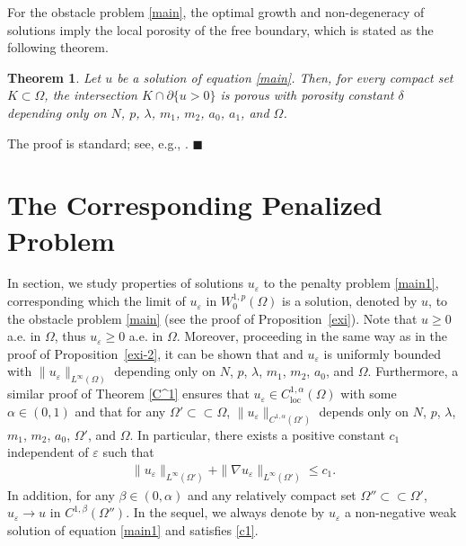 \documentclass[onecolumn]{autart}
\newtheorem{theorem}{Theorem} %
\newenvironment{proof}{{\it Proof: \enspace}}{\hfill $\blacksquare$\par}
\begin{document}
	
	
	
	
	For the obstacle problem \eqref{main},
	the optimal growth and non-degeneracy of solutions imply the local porosity of the free boundary, which is stated as the following theorem.
	
	
	\begin{theorem}\label{duo}
		Let $ u $ be  a  solution of equation \eqref{main}. Then, for every compact set $ K \subset \Omega $, the intersection $ K \cap \partial\{u > 0\} $ is porous with porosity constant $ \delta $ depending only on $N$, $p$, $\lambda$, $m_1$, $m_2$, $a_0$, $a_1$,  and $ \Omega $.
	\end{theorem}
	\begin{proof}
		The proof is standard; see, e.g.,  \cite{Karp:2000,Challal:2009,Hu:2024}.
	\end{proof}
	
	
	
	\section{The Corresponding Penalized Problem}\label{Sec.6}
	
	
	In section,  we study properties  of  solutions $u_\varepsilon$ to the   penalty problem  \eqref{main1}, corresponding which  the limit of  $u_\varepsilon$  in $W^{1,p}_0(\Omega)$ is  a solution, denoted by $u$, to the obstacle problem \eqref{main} (see the proof of Proposition~\ref{exi}). Note that $u\geq 0$ a.e. in $\Omega$, thus $u_\varepsilon \geq 0$ a.e. in $\Omega$. Moreover, proceeding in the same way as in the proof  of  Proposition~\ref{exi-2}, it can   be shown that  and
	$u_\varepsilon$ is uniformly bounded with
	$\|u_\varepsilon\|_{L^\infty(\Omega)}$   depending only on $N$, $p$, $\lambda$, $m_1$, $m_2$, $a_0$, and  $\Omega$. Furthermore,  a similar proof of  Theorem \ref{C^1} ensures that  $u_\varepsilon\in C^{1,\alpha}_{\mathrm{loc}}(\Omega)$ with some $\alpha \in (0,1)$ and that for any $\Omega' \subset \subset \Omega$,   $\|u_\varepsilon\|_{C^{1,\alpha}(\Omega')}$  {depends only on } $N$, $p$, $\lambda$, $m_1$, $m_2$, $a_0$, $\Omega'$, and $\Omega$. In particular, there exists a positive constant $c_1$  independent of $\varepsilon$  such that
	\begin{align}\label{c1}
		\|u_\varepsilon\|_{L^\infty(\Omega')} + \|\nabla u_\varepsilon\|_{L^\infty(\Omega')} \leq c_1.
	\end{align}
	In addition,    for any $\beta \in (0,\alpha)$ and any relatively compact  set $\Omega'' \subset \subset \Omega'$, $u_\varepsilon \to u$ in $C^{1,\beta}(\Omega'')$.  In the sequel, we always denote by $u_\varepsilon$ a non-negative   weak solution of equation \eqref{main1} and satisfies \eqref{c1}.
	
\end{document}
